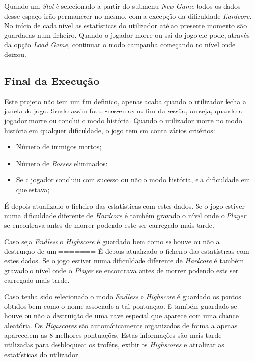 \documentclass[a4paper,11pt]{article}
\newcommand\tabitem{\setlength{\itemindent}{1cm}}
\newcommand\tab[1][0.8cm]{\hspace*{#1}}
\begin{document}
\tab Quando um \textit{Slot} é selecionado a partir do submenu \textit{New Game} todos os dados desse espaço irão permanecer no mesmo, com a excepção da dificuldade \textit{Hardcore}. No início de cada nível as estatísticas do utilizador até ao presente momento são guardadas num ficheiro. Quando o jogador morre ou sai do jogo ele pode, através da opção \textit{Load Game}, continuar o modo campanha começando no nível onde deixou. 

\pagebreak

\subsection{Final da Execução}
\tab Este projeto não tem um fim definido, apenas acaba quando o utilizador fecha a janela do jogo. Sendo assim focar-nos-emos no fim da sessão, ou seja, quando o jogador morre ou conclui o modo história. Quando o utilizador morre no modo história em qualquer dificuldade, o jogo tem em conta vários critérios:
\begin{itemize}
    \tabitem
    \item Número de inimigos mortos;
    \item Número de \textit{Bosses} eliminados;
    \item Se o jogador concluiu com sucesso ou não o modo história, e a dificuldade em que estava;
\end{itemize}
É depois atualizado o ficheiro das estatísticas com estes dados. Se o jogo estiver numa dificuldade diferente de \textit{Hardcore} é também gravado o nível onde o \textit{Player} se encontrava antes de morrer podendo este ser carregado mais tarde.
\begin{tabbing}

\end{tabbing}
Caso seja \textit{Endless} o \textit{Highscore} é guardado bem como se houve ou não a destruição de um
=======
É depois atualizado o ficheiro das estatísticas com estes dados. Se o jogo estiver numa dificuldade diferente de \textit{Hardcore} é também gravado o nível onde o \textit{Player} se encontrava antes de morrer podendo este ser carregado mais tarde. 

\vspace{8pt}

Caso tenha sido selecionado o modo \textit{Endless} o \textit{Highscore} é guardado os pontos obtidos bem como o nome associado a tal pontuação. É também guardado se houve ou não a destruição de uma nave especial que aparece com uma chance aleatória. Os \textit{Highscores} são automáticamente organizados de forma a apenas aparecerem as 8 melhores pontuações.
Estas informações são mais tarde utilizadas para desbloquear os troféus, exibir os \textit{Highscores} e atualizar as estatísticas	do utilizador.
\end{document}
